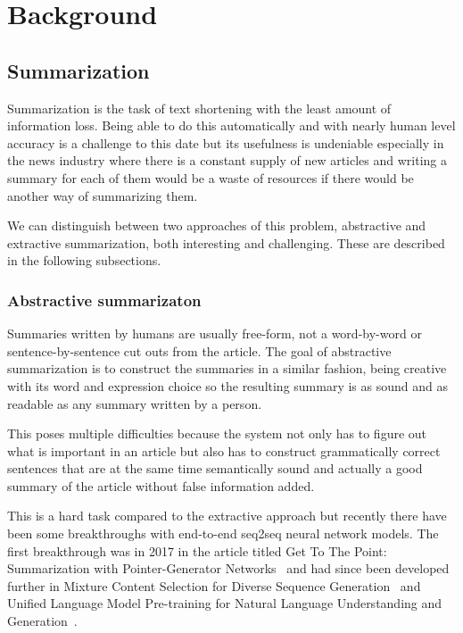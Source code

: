 \chapter{Background}\label{sect:Background}
\section{Summarization}
Summarization is the task of text shortening with the least amount of information loss. Being able to do this automatically and with nearly human level accuracy is a challenge to this date but its usefulness is undeniable especially in the news industry where there is a constant supply of new articles and writing a summary for each of them would be a waste of resources if there would be another way of summarizing them.

We can distinguish between two approaches of this problem, abstractive and extractive summarization, both interesting and challenging. These are described in the following subsections.

\subsection{Abstractive summarizaton}
Summaries written by humans are usually free-form, not a word-by-word or sentence-by-sentence cut outs from the article. The goal of abstractive summarization is to construct the summaries in a similar fashion, being creative with its word and expression choice so the resulting summary is as sound and as readable as any summary written by a person.

This poses multiple difficulties because the system not only has to figure out what is important in an article but also has to construct grammatically correct sentences that are at the same time semantically sound and actually a good summary of the article without false information added.

This is a hard task compared to the extractive approach but recently there have been some breakthroughs with end-to-end seq2seq neural network models. The first breakthrough was in 2017 in the article titled Get To The Point: Summarization with Pointer-Generator Networks~\cite{AbstractiveSum} and had since been developed further in Mixture Content Selection for Diverse Sequence Generation~\cite{DiverseAbstract} and Unified Language Model Pre-training for Natural Language Understanding and Generation~\cite{UniLM}.

